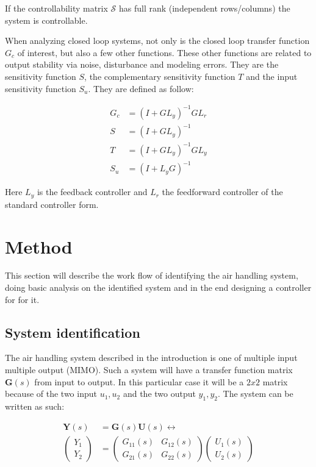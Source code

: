 \documentclass[a4paper, titlepage]{article}
\begin{document}
If the controllability matrix $\mathcal{S}$ has full rank (independent rows/columns) the system is controllable.

When analyzing closed loop systems, not only is the closed loop transfer function $G_c$ of interest, but also a few other functions.
These other functions are related to output stability via noise, disturbance and modeling errors.
They are the sensitivity function $S$, the complementary sensitivity function $T$ and the input sensitivity function $S_u$.
They are defined as follow:

\begin{equation}
\begin{split}
G_c &= (I + GL_y)^{-1}GL_r \\
S &= (I + GL_y)^{-1} \\
T &= (I + GL_y)^{-1}GL_y \\
S_u &= (I + L_yG)^{-1}
\end{split}
\label{equ:transFunc}
\end{equation}

Here $L_y$ is the feedback controller and $L_r$ the feedforward controller of the standard controller form.

\section{Method}
This section will describe the work flow of identifying the air handling system, doing basic analysis on the identified system and in the end designing a controller for for it.

\subsection{System identification}
The air handling system described in the introduction is one of multiple input multiple output (MIMO).
Such a system will have a transfer function matrix $\boldsymbol{G}(s)$ from input to output. In this particular case it will be a $2x2$ matrix because of the two input $u_1, u_2$ and the two output $y_1, y_2$.
The system can be written as such:

\begin{equation}
\begin{split}
\boldsymbol{Y}(s) &= \boldsymbol{G}(s)\boldsymbol{U}(s) \leftrightarrow \\
\begin{pmatrix}
Y_1 \\ Y_2
\end{pmatrix}
&=
\begin{pmatrix}
G_{11}(s) & G_{12}(s) \\ G_{21}(s) & G_{22}(s)
\end{pmatrix}
\begin{pmatrix}
U_1(s) \\ U_2(s)
\end{pmatrix}
\end{split}
\end{equation}
\end{document}

